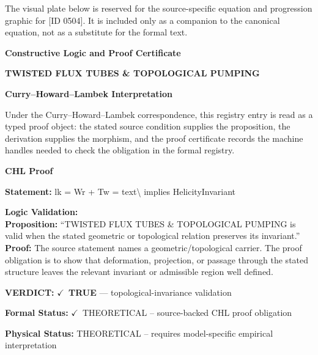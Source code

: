 \begingroup\footnotesize\sloppy
The visual plate below is reserved for the source-specific equation and progression graphic for [ID 0504]. It is included only as a companion to the canonical equation, not as a substitute for the formal text.
\par\endgroup
\ifTZPDarkEdition
{}
\fi

\clearpage
\begingroup\tzpsupportsetup
\noindent\textbf{\fontsize{10.8pt}{12.8pt}\selectfont [ID 0504] Constructive Logic and Proof Certificate}\par
\noindent\textbf{\fontsize{10pt}{12pt}\selectfont TWISTED FLUX TUBES \& TOPOLOGICAL PUMPING}\par
\vspace{0.45em}
\begingroup
\footnotesize
\setlength{\parskip}{0.22em}
\setlength{\parindent}{0pt}
\noindent\textbf{Curry--Howard--Lambek Interpretation}\par
Under the Curry--Howard--Lambek correspondence, this registry entry is read as a typed proof
object: the stated source condition supplies the proposition, the derivation supplies the
morphism, and the proof certificate records the machine handles needed to check the obligation
in the formal registry.

\vspace{0.45em}
\noindent\textbf{CHL Proof}\par
\textbf{Statement:} lk = Wr + Tw = text\textbackslash{} implies HelicityInvariant

\textbf{Logic Validation:}\\
\textbf{Proposition:} ``TWISTED FLUX TUBES \& TOPOLOGICAL PUMPING is valid when the stated geometric or
topological relation preserves its invariant.''\\
\textbf{Proof:} The source statement names a geometric/topological carrier. The proof obligation is to
show that deformation, projection, or passage through the stated structure leaves the
relevant invariant or admissible region well defined.

\textbf{VERDICT:} \ensuremath{\checkmark}\ \textbf{TRUE} --- topological-invariance validation

\textbf{Formal Status:} \ensuremath{\checkmark}\ THEORETICAL -- source-backed CHL proof obligation

\textbf{Physical Status:} THEORETICAL -- requires model-specific empirical interpretation
\par\vspace{0.45em}
\par
\ifTZPDarkEdition
{}
\fi
\endgroup
\endgroup
